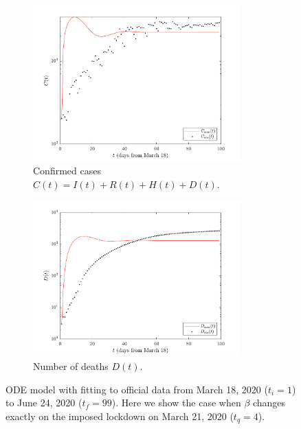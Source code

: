 \documentclass[11pt]{article}
\begin{document}
	\begin{figure}[h!]
		\centering
		\begin{subfigure}{0.5\textwidth}
			\centering
			\includegraphics[height=6cm]{cases}
			\caption{Confirmed cases $C(t) = I(t) + R(t) + H(t) + D(t)$.}
			\label{fig:ode-cases}
		\end{subfigure}%
		\begin{subfigure}{0.5\textwidth}
			\centering
			\includegraphics[height=6cm]{deaths}
			\caption{Number of deaths $D(t)$.}
			\label{fig:ode-deaths}
		\end{subfigure}
		\caption{ODE model with fitting to official data from March 18, 2020 ($t_i = 1$) to June 24, 2020 ($t_f = 99$).
		Here we show the case when $\beta$ changes exactly on the imposed lockdown on March 21, 2020 ($t_q = 4$).}
		\label{fig:ode-results}
	\end{figure}
\end{document}
